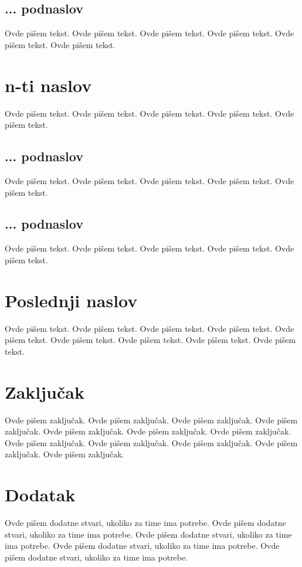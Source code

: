 \documentclass[a4paper]{article}
\begin{document}
	\subsection{... podnaslov}
	\label{subsec:podnaslovN}

	Ovde pišem tekst. 
	Ovde pišem tekst. 
	Ovde pišem tekst. 
	Ovde pišem tekst. 
	Ovde pišem tekst. 
	Ovde pišem tekst. 

	\section{n-ti naslov}
	\label{sec:naslovN}

	Ovde pišem tekst. 
	Ovde pišem tekst. 
	Ovde pišem tekst. 
	Ovde pišem tekst. 
	Ovde pišem tekst. 

	\subsection{... podnaslov}
	\label{subsec:podnaslovK}

	Ovde pišem tekst. 
	Ovde pišem tekst. 
	Ovde pišem tekst. 
	Ovde pišem tekst. 
	Ovde pišem tekst. 

	\subsection{... podnaslov}
	\label{subsec:podnaslovM}

	Ovde pišem tekst. 
	Ovde pišem tekst. 
	Ovde pišem tekst. 
	Ovde pišem tekst. 
	Ovde pišem tekst. 

	\section{Poslednji naslov}
	\label{sec:naslovM}

	Ovde pišem tekst. 
	Ovde pišem tekst. 
	Ovde pišem tekst. 
	Ovde pišem tekst. 
	Ovde pišem tekst. 
	Ovde pišem tekst. 
	Ovde pišem tekst. 
	Ovde pišem tekst. 
	Ovde pišem tekst. 

	\section{Zaključak}
	\label{sec:zakljucak}

	Ovde pišem zaključak. 
	Ovde pišem zaključak. 
	Ovde pišem zaključak. 
	Ovde pišem zaključak. 
	Ovde pišem zaključak. 
	Ovde pišem zaključak. 
	Ovde pišem zaključak. 
	Ovde pišem zaključak. 
	Ovde pišem zaključak. 
	Ovde pišem zaključak. 
	Ovde pišem zaključak. 
	Ovde pišem zaključak. 


	\appendix
	 
	

	\appendix
	\section{Dodatak}
	Ovde pišem dodatne stvari, ukoliko za time ima potrebe.
	Ovde pišem dodatne stvari, ukoliko za time ima potrebe.
	Ovde pišem dodatne stvari, ukoliko za time ima potrebe.
	Ovde pišem dodatne stvari, ukoliko za time ima potrebe.
	Ovde pišem dodatne stvari, ukoliko za time ima potrebe.


	
\end{document}
